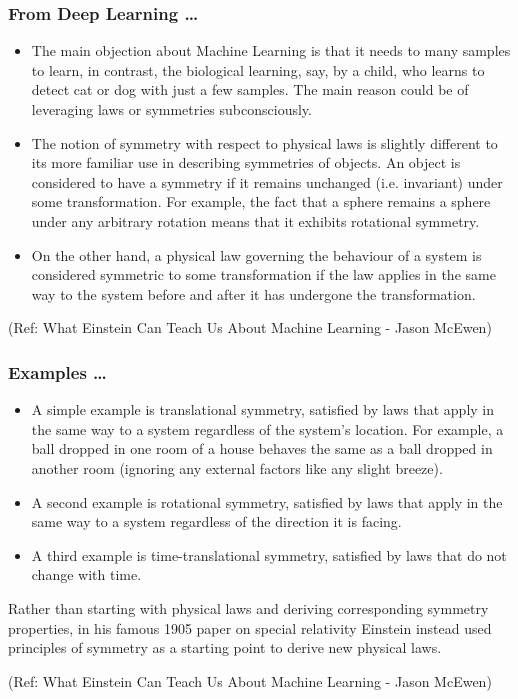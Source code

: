 \begin{frame}[fragile]\frametitle{From Deep Learning \ldots}


	\begin{itemize}
	\item The main objection about Machine Learning is that it needs to many samples to learn, in contrast, the biological learning, say, by a child, who learns to detect cat or dog with just a few samples.
The main reason could be of leveraging laws or symmetries subconsciously. 
	\item The notion of symmetry with respect to physical laws is slightly different to its more familiar use in describing symmetries of objects. An object is considered to have a symmetry if it remains unchanged (i.e. invariant) under some transformation. For example, the fact that a sphere remains a sphere under any arbitrary rotation means that it exhibits rotational symmetry.
	\item On the other hand, a physical law governing the behaviour of a system is considered symmetric to some transformation if the law applies in the same way to the system before and after it has undergone the transformation.
	\end{itemize}

{\tiny (Ref: What Einstein Can Teach Us About Machine Learning - Jason McEwen)}

\end{frame}

\begin{frame}[fragile]\frametitle{Examples \ldots}


	\begin{itemize}
	\item A simple example is translational symmetry, satisfied by laws that apply in the same way to a system regardless of the system’s location. For example, a ball dropped in one room of a house behaves the same as a ball dropped in another room (ignoring any external factors like any slight breeze).
	\item A second example is rotational symmetry, satisfied by laws that apply in the same way to a system regardless of the direction it is facing.
	\item A third example is time-translational symmetry, satisfied by laws that do not change with time.
	\end{itemize}

Rather than starting with physical laws and deriving corresponding symmetry properties, in his famous 1905 paper on special relativity Einstein instead used principles of symmetry as a starting point to derive new physical laws.

{\tiny (Ref: What Einstein Can Teach Us About Machine Learning - Jason McEwen)}

\end{frame}

